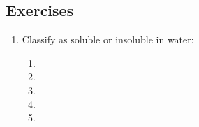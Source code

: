 \documentclass[a4paper]{memoir}
\begin{document}
\subsection*{Exercises}
\begin{enumerate}
  \item Classify as soluble or insoluble in water:
    \begin{enumerate}
      \item {}
      \item {}
      \item {}
      \item {}
      \item {}
    \end{enumerate}
\end{enumerate}
\end{document}
